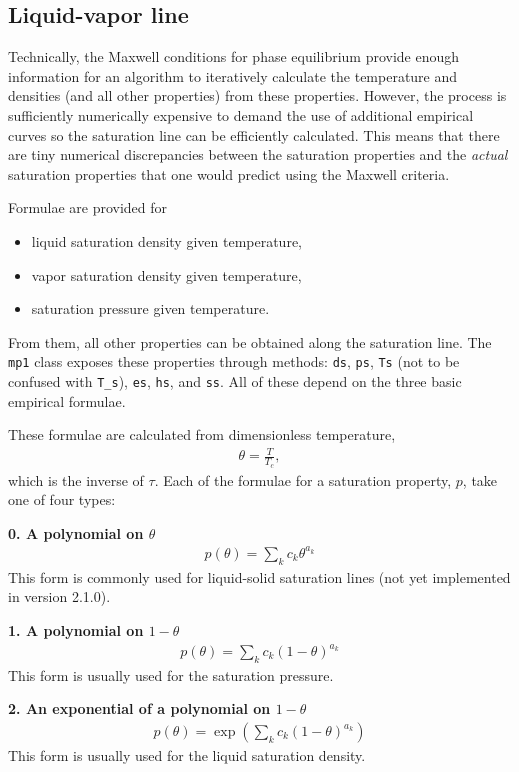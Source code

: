 \subsection{Liquid-vapor line}

Technically, the Maxwell conditions for phase equilibrium provide enough information for an algorithm to iteratively calculate the temperature and densities (and all other properties) from these properties.  However, the process is sufficiently numerically expensive to demand the use of additional empirical curves so the saturation line can be efficiently calculated.  This means that there are tiny numerical discrepancies between the saturation properties and the \emph{actual} saturation properties that one would predict using the Maxwell criteria.  

Formulae are provided for
\begin{itemize}
\item liquid saturation density given temperature,
\item vapor saturation density given temperature,
\item saturation pressure given temperature.
\end{itemize}
From them, all other properties can be obtained along the saturation line.  The \texttt{mp1} class exposes these properties through methods: \texttt{ds}, \texttt{ps}, \texttt{Ts} (not to be confused with \verb|T_s|), \texttt{es}, \texttt{hs}, and \texttt{ss}.  All of these depend on the three basic empirical formulae.

These formulae are calculated from dimensionless temperature, 
\begin{align}
\theta = \frac{T}{T_c},
\end{align}
which is the inverse of $\tau$.  Each of the formulae for a saturation property, $p$, take one of four types:

{\bf 0. A polynomial on $\theta$} 
\begin{align}
p(\theta) = \sum_k c_k \theta^{a_k}
\end{align}
This form is commonly used for liquid-solid saturation lines (not yet implemented in version 2.1.0).

{\bf 1. A polynomial on $1-\theta$}
\begin{align}
p(\theta) = \sum_k c_k (1-\theta)^{a_k}
\end{align}
This form is usually used for the saturation pressure.

{\bf 2. An exponential of a polynomial on $1-\theta$}
\begin{align}
p(\theta) = \exp \left( \sum_k c_k (1-\theta)^{a_k} \right)
\end{align}
This form is usually used for the liquid saturation density.

